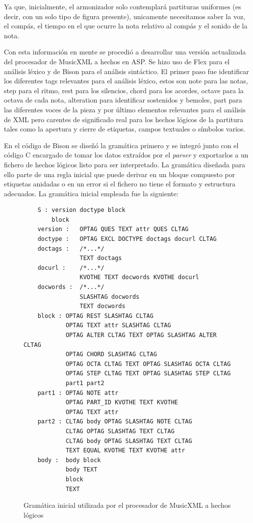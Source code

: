 Ya que, inicialmente, el armonizador solo contemplará partituras uniformes (es decir, con un solo tipo de figura presente), unicamente necesitamos saber la voz, el compás, el tiempo en el que ocurre la nota relativo al compás y el sonido de la nota.

Con esta información en mente se procedió a desarrollar una versión actualizada del procesador de MusicXML a hechos en ASP. Se hizo uso de Flex para el análisis léxico y de Bison para el análisis sintáctico. El primer paso fue identificar los diferentes tags relevantes para el análisis léxico, estos son note para las notas, step para el ritmo, rest para los silencios, chord para los acordes, octave para la octava de cada nota, alteration para identificar sostenidos y bemoles, part para las diferentes voces de la pieza y por último elementos relevantes para el análisis de XML pero carentes de significado real para los hechos lógicos de la partitura tales como la apertura y cierre de etiquetas, campos textuales o símbolos varios.

En el código de Bison se diseñó la gramática primero y se integró junto con el código C encargado de tomar los datos extraídos por el \textit{parser} y exportarlos a un fichero de hechos lógicos listo para ser interpretado. La gramática diseñada para ello parte de una regla inicial que puede derivar en un bloque compuesto por etiquetas anidadas o en un error si el fichero no tiene el formato y estructura adecuados. La gramática inicial empleada fue la siguiente:

\begin{figure}
	\centering
	\begin{verbatim}
	S : version doctype block
	    block
	version : 	OPTAG QUES TEXT attr QUES CLTAG
	doctype : 	OPTAG EXCL DOCTYPE doctags docurl CLTAG
	doctags : 	/*...*/
	            TEXT doctags
	docurl : 	/*...*/
	            KVOTHE TEXT docwords KVOTHE docurl
	docwords : 	/*...*/
	            SLASHTAG docwords
	            TEXT docwords
	block : OPTAG REST SLASHTAG CLTAG
	        OPTAG TEXT attr SLASHTAG CLTAG
	        OPTAG ALTER CLTAG TEXT OPTAG SLASHTAG ALTER CLTAG
	        OPTAG CHORD SLASHTAG CLTAG
	        OPTAG OCTA CLTAG TEXT OPTAG SLASHTAG OCTA CLTAG
	        OPTAG STEP CLTAG TEXT OPTAG SLASHTAG STEP CLTAG
	        part1 part2
	part1 : OPTAG NOTE attr
	        OPTAG PART_ID KVOTHE TEXT KVOTHE
	        OPTAG TEXT attr
	part2 : CLTAG body OPTAG SLASHTAG NOTE CLTAG
	        CLTAG OPTAG SLASHTAG TEXT CLTAG
	        CLTAG body OPTAG SLASHTAG TEXT CLTAG
	        TEXT EQUAL KVOTHE TEXT KVOTHE attr
	body : 	body block
	        body TEXT
	        block
	        TEXT
	\end{verbatim}
	\caption{Gramática inicial utilizada por el procesador de MusicXML a hechos lógicos}
	\label{fig:gramatica_inicial}
\end{figure}

